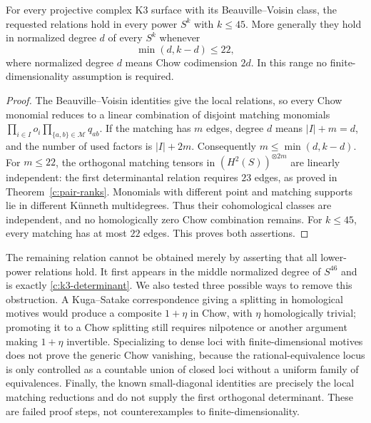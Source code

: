 \begin{corollary}
\label{c:k3-stable-range}
For every projective complex K3 surface with its Beauville--Voisin class, the requested relations hold in every power $S^k$ with $k\leq45$. More generally they hold in normalized degree $d$ of every $S^k$ whenever
\[
 \min(d,k-d)\leq22,
\]
where normalized degree $d$ means Chow codimension $2d$. In this range no finite-dimensionality assumption is required.
\end{corollary}

\begin{proof}
The Beauville--Voisin identities give the local relations, so every Chow monomial reduces to a linear combination of disjoint matching monomials
$\prod_{i\in I}o_i\prod_{\{a,b\}\in\mathcal M}q_{ab}$.
If the matching has $m$ edges, degree $d$ means $|I|+m=d$, and the number of used factors is $|I|+2m$. Consequently $m\leq\min(d,k-d)$. For $m\leq22$, the orthogonal matching tensors in $(H^2(S))^{\otimes2m}$ are linearly independent: the first determinantal relation requires $23$ edges, as proved in Theorem~\ref{c:pair-ranks}. Monomials with different point and matching supports lie in different K\"unneth multidegrees. Thus their cohomological classes are independent, and no homologically zero Chow combination remains. For $k\leq45$, every matching has at most $22$ edges. This proves both assertions.
\end{proof}

The remaining relation cannot be obtained merely by asserting that all lower-power relations hold. It first appears in the middle normalized degree of $S^{46}$ and is exactly \eqref{c:k3-determinant}. We also tested three possible ways to remove this obstruction. A Kuga--Satake correspondence giving a splitting in homological motives would produce a composite $1+\eta$ in Chow, with $\eta$ homologically trivial; promoting it to a Chow splitting still requires nilpotence or another argument making $1+\eta$ invertible. Specializing to dense loci with finite-dimensional motives does not prove the generic Chow vanishing, because the rational-equivalence locus is only controlled as a countable union of closed loci without a uniform family of equivalences. Finally, the known small-diagonal identities are precisely the local matching reductions and do not supply the first orthogonal determinant. These are failed proof steps, not counterexamples to finite-dimensionality.
